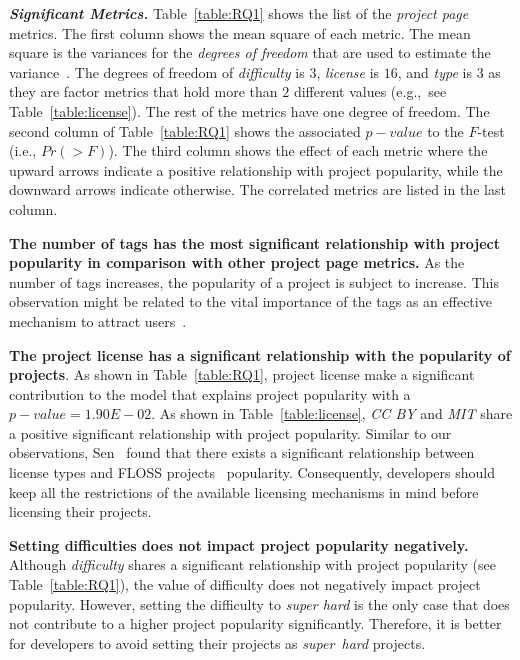 \noindent\textbf{\textit{Significant Metrics.}}
Table~\ref{table:RQ1} shows the list of the {\em project page} metrics. The first column shows the mean square of each metric. The mean square is the variances for the {\em degrees of freedom} that are used to estimate the
variance~\cite{fisher1992statistical}. The degrees of freedom of {\em difficulty} is $3$, {\em license} is $16$, and {\em type} is $3$ as they are factor metrics that hold more than $2$ different values (e.g.,~see Table~\ref{table:license}). The rest of the metrics have one degree of freedom. The second column of Table~\ref{table:RQ1} shows the associated $p-value$ to the $F$-test~\cite{lomax2013statistical} (i.e., $Pr(>F)$).
The third column shows the effect of each metric where the upward arrows indicate a positive relationship with project popularity, while the downward arrows indicate otherwise.
The correlated metrics are listed in the last column.





\textbf{The number of tags has the most significant relationship with project popularity in comparison with other project page metrics.} As the number of tags increases, the popularity of a project is subject to increase.
This observation might be related to the vital importance of the tags as an effective mechanism to attract users~\cite{zarrella2009social}.

\textbf{The project license has a significant relationship with the popularity of projects}.
As shown in Table~\ref{table:RQ1}, project license make a significant contribution to the model that explains project popularity with a $p-value=1.90E-02$.
As shown in Table~\ref{table:license}, \textit{CC BY} and \textit{MIT} share a positive significant relationship with project popularity. Similar to our observations, Sen~\cite{sen2006open} found that there exists a significant relationship between license types and FLOSS projects~\cite{crowston2004towards} popularity.
Consequently, developers should keep all the restrictions of the available licensing mechanisms in mind before licensing their projects.


\textbf{Setting difficulties does not impact project popularity negatively.}
Although {\em difficulty} shares a significant relationship with project popularity (see Table~\ref{table:RQ1}), the value of difficulty does not negatively impact project popularity. However, setting the difficulty to \textit{super hard} is the only case that does not contribute to a higher project popularity significantly.
Therefore, it is better for developers to avoid setting their projects as {\em super~hard} projects.


